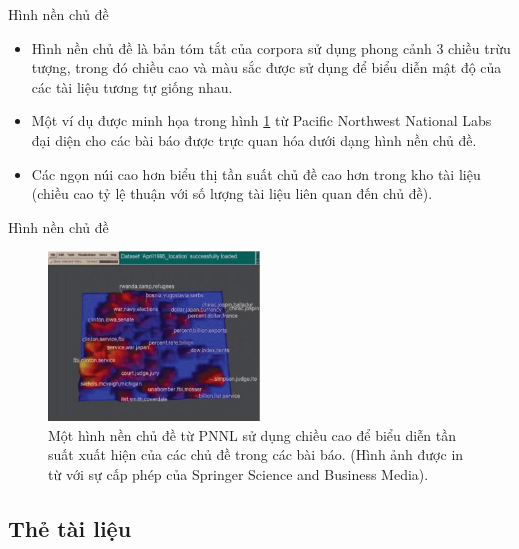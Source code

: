 \documentclass[10pt]{beamer}
\theoremstyle{remark}
\theoremstyle{definition}
\begin{document}
\begin{frame}{Hình nền chủ đề}
	\begin{itemize}
		\item Hình nền chủ đề là bản tóm tắt của corpora sử dụng phong cảnh 3 chiều trừu tượng, trong đó chiều cao và màu sắc được sử dụng để biểu diễn mật độ của các tài liệu tương tự giống nhau.
		\item Một ví dụ được minh họa trong hình \ref{fig:11} từ Pacific Northwest National Labs \cite{407} đại diện cho các bài báo được trực quan hóa dưới dạng hình nền chủ đề.
		\item Các ngọn núi cao hơn biểu thị tần suất chủ đề cao hơn trong kho tài liệu (chiều cao tỷ lệ thuận với số lượng tài liệu liên quan đến chủ đề).
	\end{itemize}
\end{frame}

\begin{frame}{Hình nền chủ đề}
	\begin{figure}[h!]
        \centering
        \includegraphics[width=0.5\textwidth]{11.png}
        \caption{Một hình nền chủ đề từ PNNL sử dụng chiều cao để biểu diễn tần suất xuất hiện của các chủ đề trong các bài báo. (Hình ảnh được in từ \cite{407} với sự cấp phép của  Springer Science and Business Media).}
        \label{fig:11}
    \end{figure}
\end{frame}

\subsection{Thẻ tài liệu}
\end{document}
